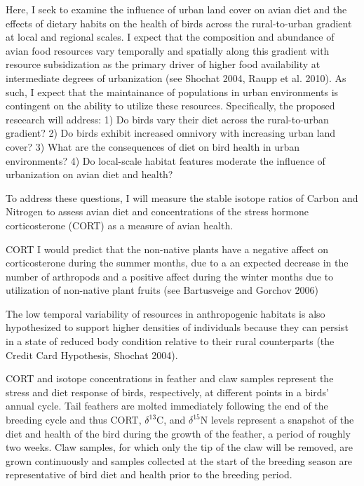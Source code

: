 \documentclass[12pt]{article}
\begin{document}

 Here, I seek to examine the influence of urban land cover on avian diet and the effects of dietary habits on the health of birds across the rural-to-urban gradient at local and regional scales. I expect that the composition and abundance of avian food resources vary temporally and spatially along this gradient with resource subsidization as the primary driver of higher food availability at intermediate degrees of urbanization (see Shochat 2004, Raupp et al. 2010). As such, I expect that the maintainance of populations in urban environments is contingent on the ability to utilize these resources. Specifically, the proposed reseearch will address:  1) Do birds vary their diet across the rural-to-urban gradient? 2) Do birds exhibit increased omnivory with increasing urban land cover? 3) What are the consequences of diet on bird health in  urban environments? 4) Do local-scale habitat features moderate the influence of urbanization on avian diet and health? \par

To address these questions, I will measure the stable isotope ratios of Carbon and Nitrogen to assess avian diet and concentrations of the stress hormone corticosterone (CORT) as a measure of avian health.

CORT
I would predict that the non-native plants have a negative affect on corticosterone during the summer months, due to a an expected decrease in the number of arthropods and a positive affect during the winter months due to utilization of non-native plant fruits (see Bartusveige and Gorchov 2006)


The low temporal variability of resources in anthropogenic habitats is also hypothesized to support higher densities of individuals because they can persist in a state of reduced body condition relative to their rural counterparts (the Credit Card Hypothesis, Shochat 2004). 

CORT and isotope concentrations in feather and claw samples represent the stress and diet response of birds, respectively, at different points in a birds' annual cycle. Tail feathers are molted immediately following the end of the breeding cycle and thus CORT, $\delta^{13}$C, and $\delta^{15}$N levels represent a snapshot of the diet and health of the bird during the growth of the feather, a period of roughly two weeks. Claw samples, for which only the tip of the claw will be removed, are grown continuously and samples collected at the start of the breeding season are representative of bird diet and health prior to the breeding period. 
\end{document}
